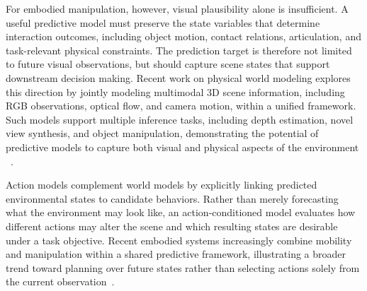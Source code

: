 \documentclass{SCIS2026}
\begin{document}
For embodied manipulation, however, visual plausibility alone is insufficient. A useful predictive model must preserve the state variables that determine interaction outcomes, including object motion, contact relations, articulation, and task-relevant physical constraints. The prediction target is therefore not limited to future visual observations, but should capture scene states that support downstream decision making. Recent work on physical world modeling explores this direction by jointly modeling multimodal 3D scene information, including RGB observations, optical flow, and camera motion, within a unified framework. Such models support multiple inference tasks, including depth estimation, novel view synthesis, and object manipulation, demonstrating the potential of predictive models to capture both visual and physical aspects of the environment ~\cite{lee2026unified}. 

Action models complement world models by explicitly linking predicted environmental states to candidate behaviors. Rather than merely forecasting what the environment may look like, an action-conditioned model evaluates how different actions may alter the scene and which resulting states are desirable under a task objective. Recent embodied systems increasingly combine mobility and manipulation within a shared predictive framework, illustrating a broader trend toward planning over future states rather than selecting actions solely from the current observation~\cite{chen2026abot}.
\end{document}
